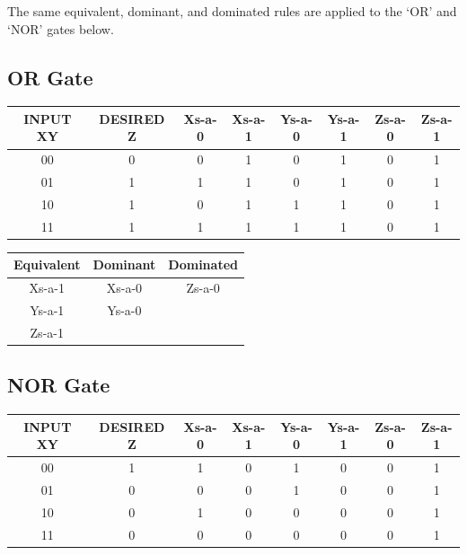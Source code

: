 \documentclass[11pt]{report}
\begin{document}
The same equivalent, dominant, and dominated rules are applied to the `OR' and `NOR' gates below.

\subsection*{OR Gate}
\begin{tabular}{ |c|c|c|c|c|c|c|c| }
\hline
INPUT XY & DESIRED Z & Xs-a-0 & Xs-a-1 & Ys-a-0 & Ys-a-1 & Zs-a-0 & Zs-a-1
\\ 
\hline
\hline
00 & 0 & 0 & \cellcolor{yellow!50}1 & 0 & \cellcolor{yellow!50}1 & 0 & \cellcolor{yellow!50}1
\\  
\hline
01 & 1 & 1 & 1 & \cellcolor{yellow!50}0 & 1 & \cellcolor{yellow!50}0 & 1
\\
\hline
10 & 1 & \cellcolor{yellow!50}0 & 1 & 1 & 1 & \cellcolor{yellow!50}0 & 1
\\
\hline
11 & 1 & 1 & 1 & 1 & 1 & \cellcolor{yellow!50}0 & 1
\\
\hline
\end{tabular}

\begin{tabular}{ |c|c|c| }
\hline
Equivalent & Dominant & Dominated
\\ 
\hline
\hline
Xs-a-1 & Xs-a-0 & Zs-a-0
\\  
\hline
Ys-a-1 & Ys-a-0 & 
\\
\hline
Zs-a-1 & & 
\\
\hline
\end{tabular}



\subsection*{NOR Gate}
\begin{tabular}{ |c|c|c|c|c|c|c|c| }
\hline
INPUT XY & DESIRED Z & Xs-a-0 & Xs-a-1 & Ys-a-0 & Ys-a-1 & Zs-a-0 & Zs-a-1
\\ 
\hline
\hline
00 & 1 & 1 & \cellcolor{yellow!50}0 & 1 & \cellcolor{yellow!50}0 & \cellcolor{yellow!50}0 & 1
\\  
\hline
01 & 0 & 0 & 0 & \cellcolor{yellow!50}1 & 0 & 0 & \cellcolor{yellow!50}1
\\
\hline
10 & 0 & \cellcolor{yellow!50}1 & 0 & 0 & 0 & 0 & \cellcolor{yellow!50}1
\\
\hline
11 & 0 & 0 & 0 & 0 & 0 & 0 & \cellcolor{yellow!50}1
\\
\hline
\end{tabular}
\end{document}
